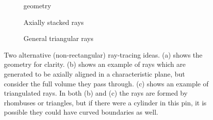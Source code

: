 {{{{        \begin{figure}[h]
          \centering
          \begin{subfigure}[t]{0.32\textwidth}
            \centering
            \def\svgwidth{0.85\linewidth}
            
            \caption{geometry\label{fig:MR:Alternatives:Geom}}
          \end{subfigure}%
          \begin{subfigure}[t]{0.32\textwidth}
            \centering
            \def\svgwidth{0.85\linewidth}
            
            \caption{Axially stacked rays\label{fig:MR:Alternative 1}}
          \end{subfigure}%
          \begin{subfigure}[t]{0.32\textwidth}
            \centering
            \def\svgwidth{0.85\linewidth}
            
            \caption{General triangular rays\label{fig:MR:Alternative 2}}
          \end{subfigure}
          \caption{
            Two alternative (non-rectangular) ray-tracing ideas.
            (a) shows the geometry for clarity.
            (b) shows an example of rays which are generated to be axially aligned in a characteristic plane, but consider the full volume they pass through.
            (c) shows an example of triangulated rays.
            In both (b) and (c) the rays are formed by rhombuses or triangles, but if there were a cylinder in this pin, it is possible they could have curved boundaries as well.
          }
          \label{figs:MR:Alternatives}
        \end{figure}
      }
    }
  }

  \printbibliography
}